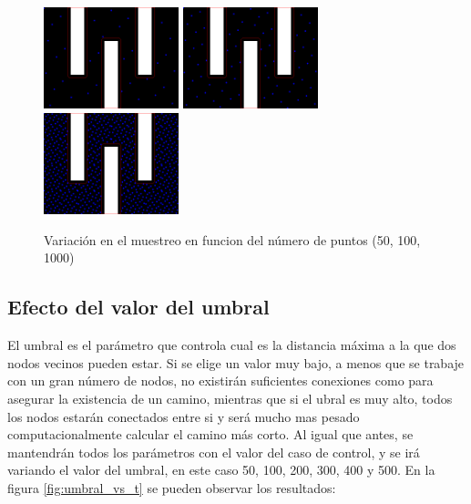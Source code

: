 \begin{figure}[h]
		\centering
        \includegraphics[width=0.35\textwidth]{images/50puntos.png}
        \includegraphics[width=0.35\textwidth]{images/100puntos.png}
        \includegraphics[width=0.35\textwidth]{images/1000puntos.png}
        \caption{Variación en el muestreo en funcion del número de puntos (50, 100, 1000)}
        \label{fig:50_100_1000nodos}
\end{figure}  

\subsection{Efecto del valor del umbral}

El umbral es el parámetro que controla cual es la distancia máxima a la que dos nodos vecinos pueden estar. Si se elige un valor muy bajo, a menos que se trabaje con un gran número de nodos, no existirán suficientes conexiones como para asegurar la existencia de un camino, mientras que si el ubral es muy alto, todos los nodos estarán conectados entre si y será mucho mas pesado computacionalmente calcular el camino más corto. Al igual que antes, se mantendrán todos los parámetros con el valor del caso de control, y se irá variando el valor del umbral, en este caso 50, 100, 200, 300, 400 y 500. En la figura \ref{fig:umbral_vs_t} se pueden observar los resultados:\\

